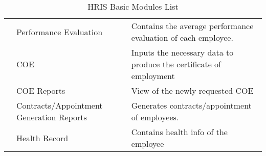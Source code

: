 \begin{table}[H]
\begin{tabular}{@{}p{2cm}p{3.5cm}p{9cm}@{}}
                         & Performance Evaluation                   & Contains the average performance evaluation of each employee.                         \\
                         & COE                                      & Inputs the necessary data to produce the certificate of employment                    \\
                         & COE Reports                              & View of the newly requested COE                                                       \\
                         & Contracts/Appointment Generation Reports & Generates contracts/appointment of employees.                                         \\
                         & Health Record                            & Contains health info of the employee                                                  \\ \bottomrule
    \end{tabular}
    \caption{HRIS Basic Modules List}
    \label{tab:hris-basic-modules}
\end{table}
    
